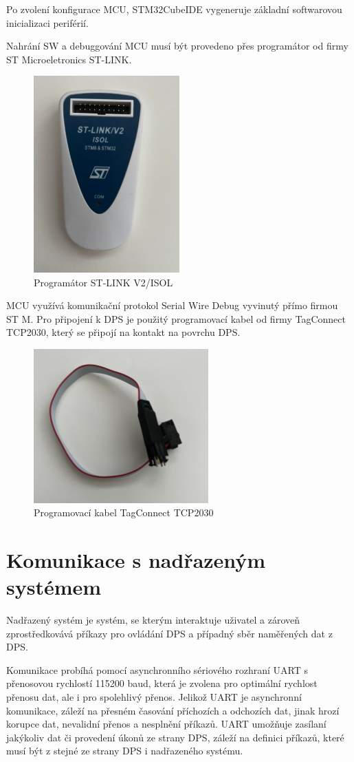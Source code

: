 Po zvolení konfigurace MCU, STM32CubeIDE vygeneruje základní softwarovou inicializaci periférií.
\par
Nahrání SW a debuggování MCU musí být provedeno přes programátor od firmy ST Microeletronics ST-LINK.
\begin{figure}[H]
    \caption{Programátor ST-LINK V2/ISOL}
    \includegraphics[width=0.5\textwidth]{pictures/stlink.jpg}
\end{figure}
MCU využívá komunikační protokol Serial Wire Debug vyvinutý přímo firmou ST M. Pro připojení k DPS je použitý programovací kabel od firmy TagConnect TCP2030, který se připojí na kontakt na povrchu DPS.
\begin{figure}[H]
    \caption{Programovací kabel TagConnect TCP2030}
    \includegraphics[width=0.6\textwidth]{pictures/tcp2030.jpg}
\end{figure}
\section{Komunikace s nadřazeným systémem}
Nadřazený systém je systém, se kterým interaktuje uživatel a zároveň zprostředkovává příkazy pro ovládání DPS a případný sběr naměřených dat z DPS.
\par
Komunikace probíhá pomocí asynchronního sériového rozhraní UART s přenosovou rychlostí 115200 baud, která je zvolena pro optimální rychlost přenosu dat, ale i pro spolehlivý přenos.
Jelikož UART je asynchronní komunikace, záleží na přesném časování příchozích a odchozích dat, jinak hrozí korupce dat, nevalidní přenos a nesplnění příkazů.
UART umožňuje zasílaní jakýkoliv dat či provedení úkonů ze strany DPS, záleží na definici příkazů, které musí být z stejné ze strany DPS i nadřazeného systému.
